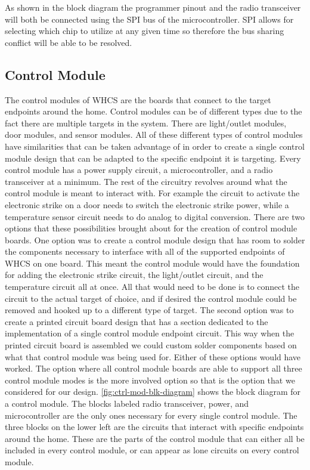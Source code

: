 
{\color{black} As shown in the block diagram the programmer pinout and the
radio transceiver will both be connected using the SPI bus of the
microcontroller. SPI allows for selecting which chip to utilize at any given
time so therefore the bus sharing conflict will be able to be resolved.}

\subsection{Control Module}
The control modules of WHCS are the boards that connect to the target
endpoints around the home. Control modules can be of different types due to the
fact there are multiple targets in the system. There are light/outlet
modules, door modules, and sensor modules. All of these different types of
control modules have similarities that can be taken advantage of in order to
create a single control module design that can be adapted to the specific
endpoint it is targeting. Every control module has a power supply
circuit, a microcontroller, and a radio transceiver at a minimum. The rest of
the circuitry revolves around what the control module is meant to interact
with. For example the circuit to activate the electronic strike on a door 
needs to switch the electronic strike power, while a temperature sensor circuit
needs to do analog to digital conversion. There are two options that these
possibilities brought about for the creation of control module boards. One option
was to create a control module design that has room to solder the components
necessary to interface with all of the supported endpoints of WHCS on one
board. This meant the control module would have the foundation for adding the
electronic strike circuit, the light/outlet circuit, and the temperature
circuit all at once. All that would need to be done is to connect the circuit
to the actual target of choice, and if desired the control module could be
removed and hooked up to a different type of target. The second option was to
create a printed circuit board design that has a section dedicated to the
implementation of a single control module endpoint circuit. This way when the
printed circuit board is assembled we could custom solder components based on
what that control module was being used for. Either of these options would have worked. The
option where all control module boards are able to support all three control
module modes is the more involved option so that is the option that we considered
for our design. \autoref{fig:ctrl-mod-blk-diagram} shows the block diagram for a control
module. The blocks labeled radio transceiver, power, and microcontroller are
the only ones necessary for every single control module. The three blocks on
the lower left are the circuits that interact with specific endpoints around
the home. These are the parts of the control module that can either all be
included in every control module, or can appear as lone circuits on every
control module.

